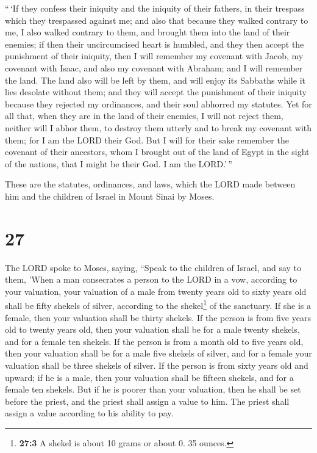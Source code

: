  ``\,`If they confess their iniquity and the iniquity of
their fathers, in their trespass which they trespassed against me; and
also that because they walked contrary to me,  I also
walked contrary to them, and brought them into the land of their
enemies; if then their uncircumcised heart is humbled, and they then
accept the punishment of their iniquity,  then I will
remember my covenant with Jacob, my covenant with Isaac, and also my
covenant with Abraham; and I will remember the land.  The
land also will be left by them, and will enjoy its Sabbaths while it
lies desolate without them; and they will accept the punishment of their
iniquity because they rejected my ordinances, and their soul abhorred my
statutes.  Yet for all that, when they are in the land of
their enemies, I will not reject them, neither will I abhor them, to
destroy them utterly and to break my covenant with them; for I am the
LORD their God.  But I will for their sake remember the
covenant of their ancestors, whom I brought out of the land of Egypt in
the sight of the nations, that I might be their God. I am the LORD.'\,''

 These are the statutes, ordinances, and laws, which the
LORD made between him and the children of Israel in Mount Sinai by
Moses.

\hypertarget{section-26}{%
\section{27}\label{section-26}}

 The LORD spoke to Moses, saying,  ``Speak
to the children of Israel, and say to them, 'When a man consecrates a
person to the LORD in a vow, according to your valuation, 
your valuation of a male from twenty years old to sixty years old shall
be fifty shekels of silver, according to the shekel\footnote{\textbf{27:3}
  A shekel is about 10 grams or about 0. 35 ounces.} of the sanctuary.
 If she is a female, then your valuation shall be thirty
shekels.  If the person is from five years old to twenty
years old, then your valuation shall be for a male twenty shekels, and
for a female ten shekels.  If the person is from a month
old to five years old, then your valuation shall be for a male five
shekels of silver, and for a female your valuation shall be three
shekels of silver.  If the person is from sixty years old
and upward; if he is a male, then your valuation shall be fifteen
shekels, and for a female ten shekels.  But if he is
poorer than your valuation, then he shall be set before the priest, and
the priest shall assign a value to him. The priest shall assign a value
according to his ability to pay.

